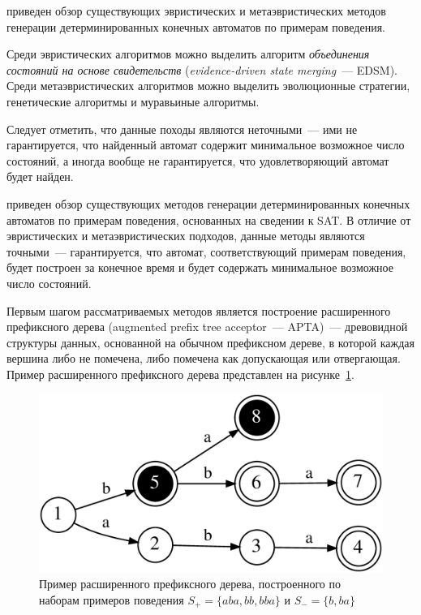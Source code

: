 \insection{\ref{sec:review:heuristic-dfa-inf}} приведен обзор существующих эвристических и метаэвристических методов генерации детерминированных конечных автоматов по примерам поведения. 

Среди эвристических алгоритмов можно выделить алгоритм \emph{объединения состояний на основе свидетельств} (\emph{evidence-driven state merging}~--- EDSM).
Среди метаэвристических алгоритмов можно выделить эволюционные стратегии, генетические алгоритмы и муравьиные алгоритмы.

Следует отметить, что данные походы являются неточными~--- ими не гарантируется, что найденный автомат содержит минимальное возможное число состояний, а иногда вообще не гарантируется, что удовлетворяющий автомат будет найден.


\insection{\ref{sec:review:sat-dfa-inf}} приведен обзор существующих методов генерации детерминированных конечных автоматов по примерам поведения, основанных на сведении к SAT. В отличие от эвристических и метаэвристических подходов, данные методы являются точными~--- гарантируется, что автомат, соответствующий примерам поведения, будет построен за конечное время и будет содержать минимальное возможное число состояний.

Первым шагом рассматриваемых методов является построение расширенного префиксного дерева (augmented prefix tree acceptor~--- APTA)~--- древовидной структуры данных, основанной на обычном префиксном дереве, в которой каждая вершина либо не помечена, либо помечена как допускающая или отвергающая. 
Пример расширенного префиксного дерева представлен на рисунке~\ref{syn:img:apta-ex}.

\begin{figure}[ht]
  \centering
  \includegraphics[scale=0.14]{img/datamod/FIG2a.eps}
  \caption{Пример расширенного префиксного дерева, построенного по наборам примеров поведения $S_{+} = \{aba, bb, bba\}$ и $S_{-} = \{b, ba\}$}
  \label{syn:img:apta-ex}
\end{figure}

